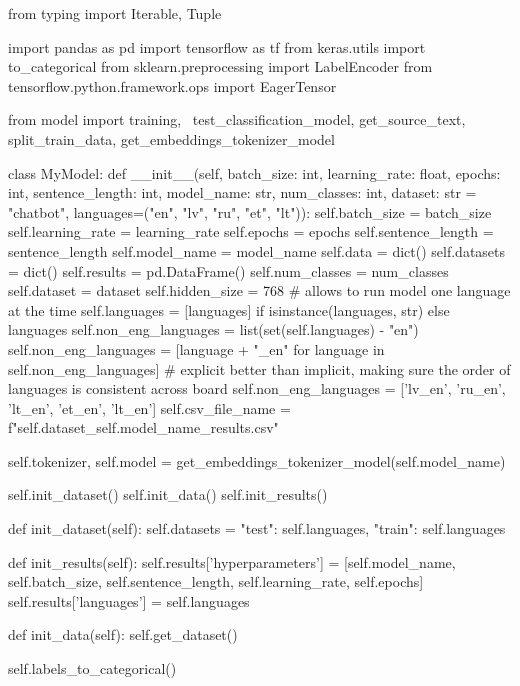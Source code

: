 \begin{python}
from typing import Iterable, Tuple

import pandas as pd
import tensorflow as tf
from keras.utils import to_categorical
from sklearn.preprocessing import LabelEncoder
from tensorflow.python.framework.ops import EagerTensor

from model import training, \
    test_classification_model, get_source_text, split_train_data, get_embeddings_tokenizer_model


class MyModel:
    def __init__(self, batch_size: int, learning_rate: float, epochs: int, sentence_length: int, model_name: str,
                 num_classes: int, dataset: str = "chatbot", languages=("en", "lv", "ru", "et", "lt")):
        self.batch_size = batch_size
        self.learning_rate = learning_rate
        self.epochs = epochs
        self.sentence_length = sentence_length
        self.model_name = model_name
        self.data = dict()
        self.datasets = dict()
        self.results = pd.DataFrame()
        self.num_classes = num_classes
        self.dataset = dataset
        self.hidden_size = 768
        # allows to run model one language at the time
        self.languages = [languages] if isinstance(languages, str) else languages
        self.non_eng_languages = list(set(self.languages) - {"en"})
        self.non_eng_languages = [language + "_en" for language in self.non_eng_languages]
        # explicit better than implicit, making sure the order of languages is consistent across board
        self.non_eng_languages = ['lv_en', 'ru_en', 'lt_en', 'et_en', 'lt_en']
        self.csv_file_name = f"{self.dataset}_{self.model_name}_results.csv"

        self.tokenizer, self.model = get_embeddings_tokenizer_model(self.model_name)

        self.init_dataset()
        self.init_data()
        self.init_results()

    def init_dataset(self):
        self.datasets = {
            "test": self.languages,
            "train": self.languages
        }

    def init_results(self):
        self.results['hyperparameters'] = [self.model_name, self.batch_size, self.sentence_length, self.learning_rate,
                                           self.epochs]
        self.results['languages'] = self.languages

    def init_data(self):
        self.get_dataset()

        self.labels_to_categorical()


\end{python}
